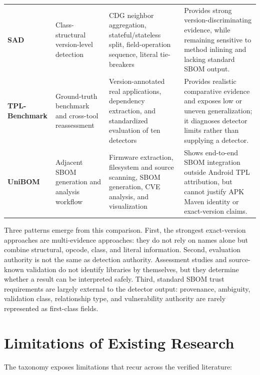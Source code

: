 \begin{longtable}{p{}p{}p{}p{}}
\textbf{SAD} \cite{zhou2025sad} &
Class-structural version-level detection &
CDG neighbor aggregation, stateful/stateless split, field-operation sequence,
literal tie-breakers &
Provides strong version-discriminating evidence, while remaining sensitive to
method inlining and lacking standard SBOM output.\\

\textbf{TPL-Benchmark} \cite{gu2025tplbenchmark} &
Ground-truth benchmark and cross-tool reassessment &
Version-annotated real applications, dependency extraction, and standardized
evaluation of ten detectors &
Provides realistic comparative evidence and exposes low or uneven
generalization; it diagnoses detector limits rather than supplying a detector.\\

\textbf{UniBOM} \cite{safronov2025unibom} &
Adjacent SBOM generation and analysis workflow &
Firmware extraction, filesystem and source scanning, SBOM generation, CVE
analysis, and visualization &
Shows end-to-end SBOM integration outside Android TPL attribution, but cannot
justify APK Maven identity or exact-version claims.\\
\end{longtable}
\endgroup

Three patterns emerge from this comparison. First, the strongest exact-version
approaches are multi-evidence approaches: they do not rely on names alone but
combine structural, opcode, class, and literal information. Second,
evaluation authority is not the same as detection authority. Assessment
studies and source-known validation do not identify libraries by themselves,
but they determine whether a result can be interpreted safely. Third,
standard SBOM trust requirements are largely external to the detector output:
provenance, ambiguity, validation class, relationship type, and vulnerability
authority are rarely represented as first-class fields.

\section{Limitations of Existing Research}

The taxonomy exposes limitations that recur across the verified literature:

